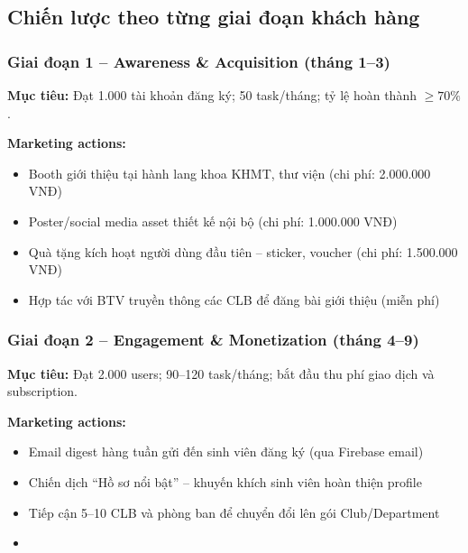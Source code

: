 
\subsection{Chiến lược theo từng giai đoạn khách hàng}

\subsubsection{Giai đoạn 1 -- Awareness \& Acquisition (tháng 1--3)}

\textbf{Mục tiêu:} Đạt 1.000 tài khoản đăng ký; 50 task/tháng; tỷ lệ hoàn thành $\geq 70\%$.

\textbf{Marketing actions:}
\begin{itemize}
  \item Booth giới thiệu tại hành lang khoa KHMT, thư viện (chi phí: 2.000.000 VNĐ)
  \item Poster/social media asset thiết kế nội bộ (chi phí: 1.000.000 VNĐ)
  \item Quà tặng kích hoạt người dùng đầu tiên -- sticker, voucher (chi phí: 1.500.000 VNĐ)
  \item Hợp tác với BTV truyền thông các CLB để đăng bài giới thiệu (miễn phí)
\end{itemize}

\subsubsection{Giai đoạn 2 -- Engagement \& Monetization (tháng 4--9)}

\textbf{Mục tiêu:} Đạt 2.000 users; 90--120 task/tháng; bắt đầu thu phí giao dịch và subscription.

\textbf{Marketing actions:}
\begin{itemize}
  \item Email digest hàng tuần gửi đến sinh viên đăng ký (qua Firebase email)
  \item Chiến dịch ``Hồ sơ nổi bật'' -- khuyến khích sinh viên hoàn thiện profile
  \item Tiếp cận 5--10 CLB và phòng ban để chuyển đổi lên gói Club/Department
  \item [TODO: Thêm các marketing action cụ thể của nhóm]
\end{itemize}

